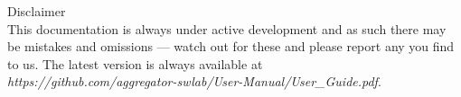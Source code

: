\vfill
{\large Disclaimer}\\
This documentation is always under active development and as such there may be mistakes and omissions — watch out for these and please report any you find to us. The latest version is always available at \\ \textit{https://github.com/aggregator-swlab/User-Manual/User\_Guide.pdf}.

